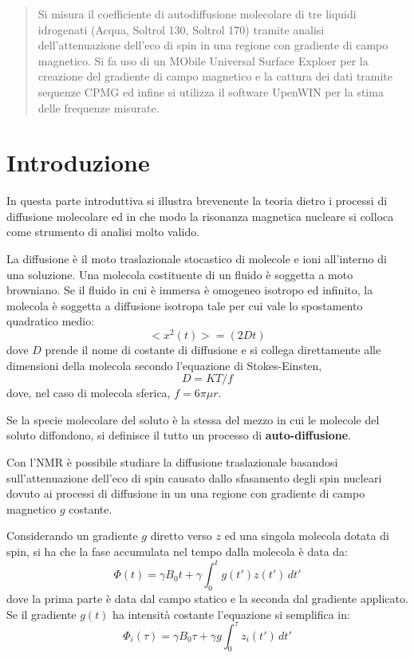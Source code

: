 \maketitle

\begin{abstract}
Si misura il coefficiente di autodiffusione molecolare di tre liquidi idrogenati (Acqua, Soltrol 130, Soltrol 170) tramite analisi dell'attenuazione dell'eco di spin in una regione con gradiente di campo magnetico. Si fa uso di un MObile Universal Surface Exploer per la creazione del gradiente di campo magnetico e la cattura dei dati tramite sequenze CPMG ed infine si utilizza il software UpenWIN per la stima delle frequenze misurate.
\end{abstract}

\section*{Introduzione}

In questa parte introduttiva si illustra brevenente la teoria dietro i processi di diffusione molecolare ed in che modo la risonanza magnetica nucleare si colloca come strumento di analisi molto valido.

La diffusione è il moto traslazionale stocastico di molecole e ioni all'interno di una soluzione. Una molecola costituente di un fluido è soggetta a moto browniano. Se il fluido in cui è immersa è omogeneo isotropo ed infinito, la molecola è soggetta a diffusione isotropa tale per cui vale lo spostamento quadratico medio:
\begin{equation}
	<x^2(t)> = (2Dt)
\end{equation}
dove $D$ prende il nome di costante di diffusione e si collega direttamente alle dimensioni della molecola secondo l'equazione di Stokes-Einsten,
\begin{equation}
	D = KT/f
\end{equation}
dove, nel caso di molecola sferica, $f = 6\pi\mu r$.

Se la specie molecolare del soluto è la stessa del mezzo in cui le molecole del soluto diffondono, si definisce il tutto un processo di \textbf{auto-diffusione}.

Con l'NMR è possibile studiare la diffusione traslazionale basandosi sull'attenuazione dell'eco di spin causato dallo sfasamento degli spin nucleari dovuto ai processi di diffusione in un una regione con gradiente di campo magnetico $g$ costante.

Considerando un gradiente $g$ diretto verso $z$ ed una singola molecola dotata di spin, si ha che la fase accumulata nel tempo dalla molecola è data da:
\begin{equation}
	\Phi(t) = \gamma B_0 t + \gamma \int_0^t g(t')z(t')\,dt'
\end{equation}
dove la prima parte è data dal campo statico e la seconda dal gradiente applicato. Se il gradiente $g(t)$ ha intensità costante l'equazione si semplifica in:
\begin{equation}
	\Phi_i(\tau) = \gamma B_0 \tau + \gamma g \int_{0}^{\tau}z_i(t')\,dt'
\end{equation}

